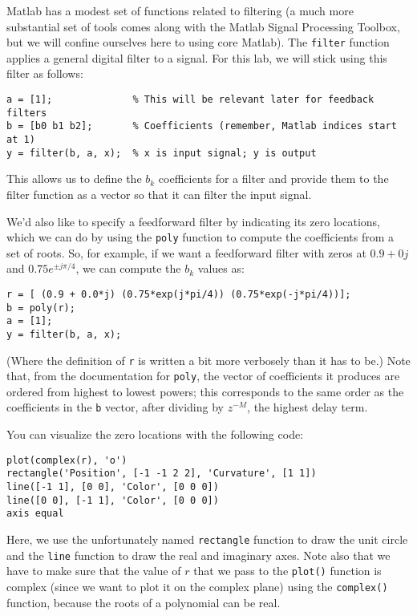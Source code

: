 Matlab has a modest set of functions related to filtering (a much more
substantial set of tools comes along with the Matlab Signal Processing
Toolbox, but we will confine ourselves here to using core Matlab). The
\verb|filter| function applies a general digital filter to a
signal. For this lab, we will stick using this filter as follows:
\begin{lstlisting}[style=Matlab-editor,basicstyle=\mlttfamily\small]
a = [1];              % This will be relevant later for feedback filters
b = [b0 b1 b2];       % Coefficients (remember, Matlab indices start at 1)
y = filter(b, a, x);  % x is input signal; y is output
\end{lstlisting}
This allows us to define the $b_k$ coefficients for a filter and provide
them to the filter function as a vector so that it can filter the
input signal.

We'd also like to specify a feedforward filter by indicating its zero
locations, which we can do by using the \verb|poly| function to
compute the coefficients from a set of roots. So, for example, if we
want a feedforward filter with zeros at $0.9 + 0j$ and $0.75e^{\pm j
\pi/4}$, we can compute the $b_k$ values as:
\begin{lstlisting}[style=Matlab-editor,basicstyle=\mlttfamily\small]
r = [ (0.9 + 0.0*j) (0.75*exp(j*pi/4)) (0.75*exp(-j*pi/4))];
b = poly(r);
a = [1];
y = filter(b, a, x);
\end{lstlisting}
(Where the definition of \verb|r| is written a bit more verbosely than
it has to be.) Note that, from the documentation for \verb|poly|, the
vector of coefficients it produces are ordered from highest to lowest
powers; this corresponds to the same order as the coefficients in the
\verb|b| vector, after dividing by $z^{-M}$, the highest delay
term.

You can visualize the zero locations with the following code:
\begin{lstlisting}[style=Matlab-editor,basicstyle=\mlttfamily\small]
plot(complex(r), 'o')
rectangle('Position', [-1 -1 2 2], 'Curvature', [1 1])
line([-1 1], [0 0], 'Color', [0 0 0])
line([0 0], [-1 1], 'Color', [0 0 0])
axis equal
\end{lstlisting}
Here, we use the unfortunately named \verb|rectangle| function to draw
the unit circle and the \verb|line| function to draw the real and
imaginary axes. Note also that we have to make sure that the value of
$r$ that we pass to the \verb|plot()| function is complex (since we
want to plot it on the complex plane) using the \verb|complex()|
function, because the roots of a polynomial can be real.

